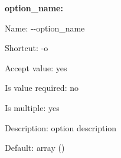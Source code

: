 {\bfseries option\+\_\+name\+:}


\begin{DoxyItemize}
\item Name\+: {\ttfamily -\/-\/option\+\_\+name}
\item Shortcut\+: {\ttfamily -\/o}
\item Accept value\+: yes
\item Is value required\+: no
\item Is multiple\+: yes
\item Description\+: option description
\item Default\+: {\ttfamily array ()} 
\end{DoxyItemize}